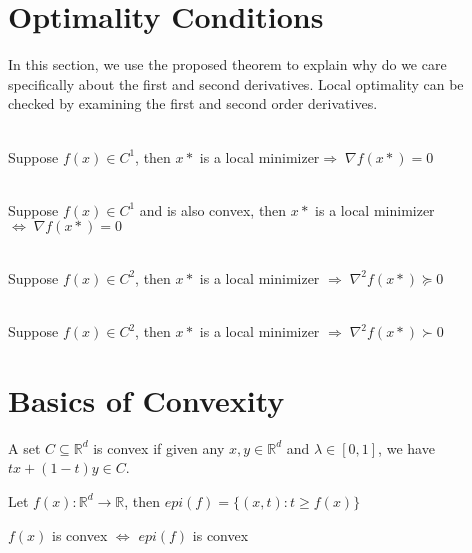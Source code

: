 \section{Optimality Conditions}
In this section, we use the proposed theorem to explain why do we care specifically about the first and second derivatives. Local optimality can be checked by examining the first and second order derivatives.

\begin{theorem}~\\
    \indent Suppose $f(x) \in C^1$, then $x*$ is a local minimizer$\Rightarrow \; \nabla f(x*) = 0$
\end{theorem}

\begin{theorem}~\\
    \indent Suppose $f(x) \in C^1$ and is also convex, then $x*$ is a local minimizer $\Leftrightarrow \; \nabla f(x*) = 0$
\end{theorem}

\begin{theorem}~\\
    \indent Suppose $f(x) \in C^2$, then $x*$ is a local minimizer $\Rightarrow \; \nabla^2 f(x*) \succeq 0$ 
\end{theorem}

\begin{theorem}~\\
    \indent Suppose $f(x) \in C^2$, then $x*$ is a local minimizer $\Rightarrow \; \nabla^2 f(x*) \succ 0$
\end{theorem}


\section{Basics of Convexity}
\begin{definition}
    A set $C \subseteq \mathbb{R}^d$ is convex if given any $x,y \in \mathbb{R}^d$ and $\lambda \in [0,1]$, we have $tx + (1-t)y \in C$.
\end{definition}
\begin{definition}[Epigraph]
    Let $f(x): \mathbb{R}^d \rightarrow \mathbb{R}$, then $epi(f) = \{(x, t) : t \geq f(x)\}$
\end{definition}
\begin{lemma}
    $f(x)$ is convex $\Leftrightarrow$ $epi(f)$ is convex
\end{lemma}

